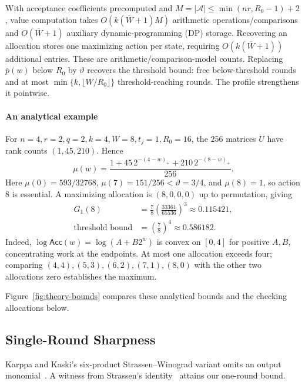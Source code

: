 With acceptance coefficients precomputed and
$M=|\mathcal A|\le\min(nr,R_0-1)+2$, value computation takes
$O(k(\overline W+1)M)$ arithmetic operations/comparisons and
$O(\overline W+1)$ auxiliary dynamic-programming (DP) storage. Recovering an allocation stores
one maximizing action per state, requiring $O(k(\overline W+1))$
additional entries. These are arithmetic/comparison-model counts.
Replacing $\overline p(w)$ below $R_0$ by $\vartheta$ recovers the threshold
bound: free below-threshold rounds and at most
$\min\{k,\lfloor W/R_0\rfloor\}$ threshold-reaching rounds.
The profile strengthens it pointwise.

\paragraph{An analytical example}
For $n=4,r=2,q=2,k=4,W=8,t_j=1,R_0=16$, the $256$ matrices $U$
have rank counts $(1,45,210)$. Hence
\begin{equation}
\mu(w)=\frac{1+45\,2^{-(4-w)_+}+210\,2^{-(8-w)_+}}{256}.
\label{ext:eq-profile-example}
\end{equation}
Here $\mu(0)=593/32768$, $\mu(7)=151/256<\vartheta=3/4$, and
$\mu(8)=1$, so action $8$ is essential. A maximizing allocation is
$(8,0,0,0)$ up to permutation, giving
\begin{equation}
\begin{aligned}
G_1(8)&=\frac78\left(\frac{33361}{65536}\right)^3\approx0.115421,\\
\text{threshold bound}&=\left(\frac78\right)^4\approx0.586182.
\end{aligned}
\label{ext:eq-profile-example-result}
\end{equation}
Indeed, $\log\mathsf{Acc}(w)=\log(A+B2^w)$ is convex on $[0,4]$
for positive $A,B$, concentrating work at the endpoints. At most one
allocation exceeds four; comparing $(4,4),(5,3),(6,2),(7,1),(8,0)$
with the other two allocations zero establishes the maximum.


Figure~\ref{fig:theory-bounds} compares these analytical bounds and the
checking allocations below.

\subsection{Single-Round Sharpness}
\label{ext:sec-sharpness}

Karppa and Kaski's six-product Strassen--Winograd variant omits an output
monomial~\cite[Sec.~1.1]{KarppaKaski2019}. A witness from Strassen's
identity~\cite{strassen} attains our one-round bound.

